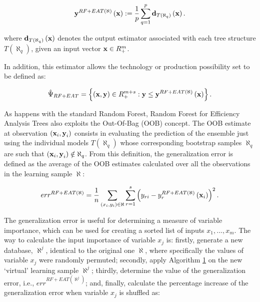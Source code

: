 \begin{equation} \label{(6)} 
{\it \textbf{y}}^{RF+EAT\left(\aleph \right)} \left({\it \textbf{x}}\right):=\frac{1}{p} \sum_{q=1}^{p}{\it \textbf{d}}_{T\left(\aleph _{q} \right)} \left({\it \textbf{x}}\right).  
\end{equation}

where \({\it \textbf{d}}_{T\left(\aleph _{q} \right)} \left({\it \textbf{x}}\right)\) denotes the output estimator associated with each tree structure \(T\left(\aleph _{q} \right)\), given an input vector \({\it \textbf{x}}\in R_{+}^{m}\).

In addition, this estimator allows the technology or production possibility set to be defined as:

\begin{equation} \label{(7)} 
\hat{\Psi }_{RF+EAT} =\left\{\left({\it \textbf{x}},{\it \textbf{y}}\right)\in R_{+}^{m+s} :{\it \textbf{y}}\le {\it \textbf{y}}^{RF+EAT\left(\aleph \right)} \left({\it \textbf{x}}\right)\right\}. 
\end{equation}

As happens with the standard Random Forest, Random Forest for Efficiency Analysis Trees also exploits the Out-Of-Bag (OOB) concept. The OOB estimate at observation \(\left({\it \textbf{x}}_{i} ,{\it \textbf{y}}_{i} \right)\) consists in evaluating the prediction of the ensemble just using the individual models \(T\left(\aleph _{q} \right)\) whose corresponding bootstrap samples \(\aleph _{q}\) are such that \(\left({\it \textbf{x}}_{i},{\it \textbf{y}}_{i} \right)\notin \aleph _{q}\). From this definition, the generalization error is defined as the average of the OOB estimates calculated over all the observations in the learning sample \(\aleph\):

\begin{equation} \label{(8)} 
err^{RF+EAT\left(\aleph \right)} =\frac{1}{n} \sum_{\left(x_{i} ,y_{i} \right)\in \aleph }\sum_{r=1}^{s}\left(y_{ri} -y_{r}^{RF+EAT\left(\aleph \right)} \left({\it \textbf{x}}_{i} \right)\right)^{2}.    
\end{equation}

The generalization error is useful for determining a measure of variable importance, which can be used for creating a sorted list of inputs \(x_{1} ,...,x_{m}\). The way to calculate the input importance of variable \(x_{j}\) is: firstly, generate a new database, \(\aleph ^{j}\), identical to the original one \(\aleph\), where specifically the values of variable \(x_{j}\) were randomly permuted; secondly, apply Algorithm \hyperref[alg:algo1]{1} on the new `virtual' learning sample \(\aleph ^{j}\); thirdly, determine the value of the generalization error, i.e., \(err^{RF+EAT\left(\aleph ^{j} \right)}\); and, finally, calculate the percentage increase of the generalization error when variable \(x_{j}\) is shuffled as:


